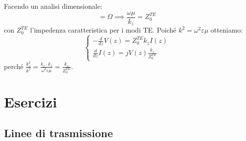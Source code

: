 \documentclass{book}
\begin{document}
        Facendo un analisi dimensionale:
        \begin{equation}
            [\frac{\omega \mu}{k_{z}}] = \Omega \implies \frac{\omega \mu}{k_{z}} = Z_{0} ^{TE}
        \end{equation}
        con $Z_{0} ^{TE}$ l'impedenza caratteristica per i modi TE. Poiché $k^{2}=\omega^{2} \varepsilon \mu$ otteniamo:
        \begin{equation}
            \begin{cases}
            -\frac{d}{dz}V(z) = Z_{0} ^{TE} k_{z}I(z) \\
            \frac{d}{dz}I(z) = j V(z) \displaystyle \frac{k_{z}}{Z_{0} ^{TE}}
            \end{cases}
        \end{equation}
        perché $\displaystyle \frac{k^{2} _{z}}{k ^{2}} = \frac{k_{z} \cdot k_{z}}{\omega ^{2} \varepsilon \mu} = \frac{k_{z}}{Z_{0} ^{TE}}$.
        \chapter{Esercizi}
    \section{Linee di trasmissione}
\end{document}
